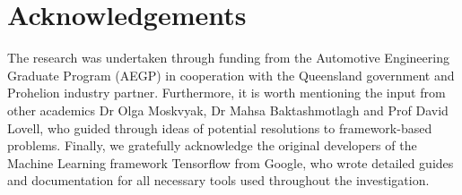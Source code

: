 \section{Acknowledgements} \label{sec:acknowledgements}
The research was undertaken through funding from the Automotive Engineering Graduate Program (AEGP) in cooperation with the Queensland government and Prohelion industry partner.
Furthermore, it is worth mentioning the input from other academics Dr Olga Moskvyak, Dr Mahsa Baktashmotlagh and Prof David Lovell, who guided through ideas of potential resolutions to framework-based problems.
Finally, we gratefully acknowledge the original developers of the Machine Learning framework Tensorflow from Google, who wrote detailed guides and documentation for all necessary tools used throughout the investigation.
